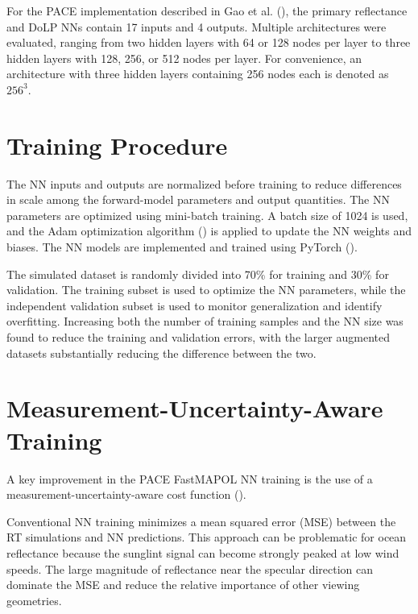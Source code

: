 \documentclass[
  11pt,
  letterpaper,
]{scrreprt}
\begin{document}
For the PACE implementation described in Gao et al.
(), the primary reflectance and DoLP NNs
contain 17 inputs and 4 outputs. Multiple architectures were evaluated,
ranging from two hidden layers with 64 or 128 nodes per layer to three
hidden layers with 128, 256, or 512 nodes per layer. For convenience, an
architecture with three hidden layers containing 256 nodes each is
denoted as \(256^3\).

\section{Training Procedure}\label{training-procedure}

The NN inputs and outputs are normalized before training to reduce
differences in scale among the forward-model parameters and output
quantities. The NN parameters are optimized using mini-batch training. A
batch size of 1024 is used, and the Adam optimization algorithm
() is applied to update
the NN weights and biases. The NN models are implemented and trained
using PyTorch ().

The simulated dataset is randomly divided into 70\% for training and
30\% for validation. The training subset is used to optimize the NN
parameters, while the independent validation subset is used to monitor
generalization and identify overfitting. Increasing both the number of
training samples and the NN size was found to reduce the training and
validation errors, with the larger augmented datasets substantially
reducing the difference between the two.

\section{Measurement-Uncertainty-Aware
Training}\label{measurement-uncertainty-aware-training}

A key improvement in the PACE FastMAPOL NN training is the use of a
measurement-uncertainty-aware cost function
().

Conventional NN training minimizes a mean squared error (MSE) between
the RT simulations and NN predictions. This approach can be problematic
for ocean reflectance because the sunglint signal can become strongly
peaked at low wind speeds. The large magnitude of reflectance near the
specular direction can dominate the MSE and reduce the relative
importance of other viewing geometries.
\end{document}
